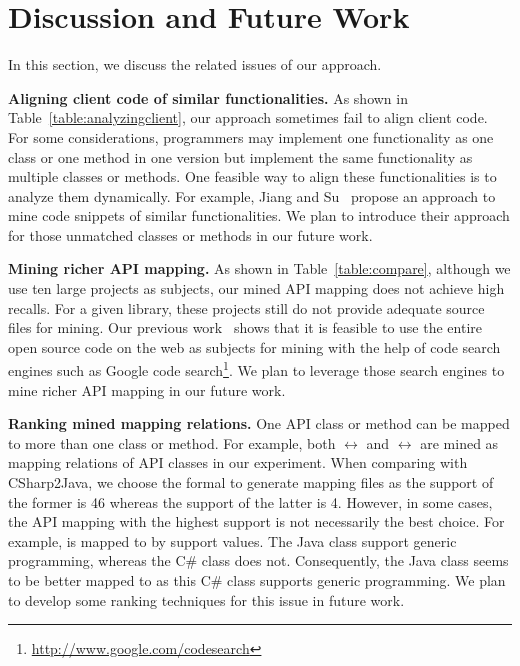 \section{Discussion and Future Work}
\label{sec:discuss} In this section, we discuss the related issues
of our approach.

\textbf{Aligning client code of similar functionalities.} As shown
in Table~\ref{table:analyzingclient}, our approach sometimes fail to
align client code. For some considerations, programmers may
implement one functionality as one class or one method in one
version but implement the same functionality as multiple classes or
methods. One feasible way to align these functionalities is to
analyze them dynamically. For example, Jiang and
Su~\cite{jiang2009automatic} propose an approach to mine code
snippets of similar functionalities. We plan to introduce their
approach for those unmatched classes or methods in our future work.

\textbf{Mining richer API mapping.} As shown in
Table~\ref{table:compare}, although we use ten large projects as
subjects, our mined API mapping does not achieve high recalls. For a
given library, these projects still do not provide adequate source
files for mining. Our previous
work~\cite{thummalapenta07parseweb,thummalapentaase08spotweb} shows
that it is feasible to use the entire open source code on the web as
subjects for mining with the help of code search engines such as
Google code search\footnote{\url{http://www.google.com/codesearch}}.
We plan to leverage those search engines to mine richer API mapping
in our future work.

\textbf{Ranking mined mapping relations.} One API class or method
can be mapped to more than one class or method. For example, both
$\leftrightarrow$ 
and $\leftrightarrow$
 are mined as mapping relations of API classes
in our experiment. When comparing with CSharp2Java, we choose the
formal to generate mapping files as the support of the former is 46
whereas the support of the latter is 4. However, in some cases, the
API mapping with the highest support is not necessarily the best
choice. For example,  is mapped to
 by support values. The Java
class support generic programming, whereas the C\# class does not.
Consequently, the Java class seems to be better mapped to
 as this C\# class supports
generic programming. We plan to develop some ranking techniques for
this issue in future work.


